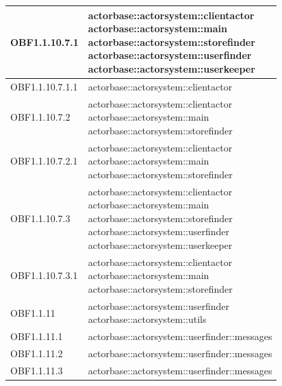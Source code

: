 \documentclass{scalatekids-article}
\begin{document}
\begin{longtable}[H]{|p{6cm}|p{11cm}|}
\hline
OBF1.1.10.7.1 & \multiLineCell[t]{actorbase::actorsystem::clientactor\\actorbase::actorsystem::main\\actorbase::actorsystem::storefinder\\actorbase::actorsystem::userfinder\\actorbase::actorsystem::userkeeper\\}\\
\hline
OBF1.1.10.7.1.1 & \multiLineCell[t]{actorbase::actorsystem::clientactor\\}\\
\hline
OBF1.1.10.7.2 & \multiLineCell[t]{actorbase::actorsystem::clientactor\\actorbase::actorsystem::main\\actorbase::actorsystem::storefinder\\}\\
\hline
OBF1.1.10.7.2.1 & \multiLineCell[t]{actorbase::actorsystem::clientactor\\actorbase::actorsystem::main\\actorbase::actorsystem::storefinder\\}\\
\hline
OBF1.1.10.7.3 & \multiLineCell[t]{actorbase::actorsystem::clientactor\\actorbase::actorsystem::main\\actorbase::actorsystem::storefinder\\actorbase::actorsystem::userfinder\\actorbase::actorsystem::userkeeper\\}\\
\hline
OBF1.1.10.7.3.1 & \multiLineCell[t]{actorbase::actorsystem::clientactor\\actorbase::actorsystem::main\\actorbase::actorsystem::storefinder\\}\\
\hline
OBF1.1.11 & \multiLineCell[t]{actorbase::actorsystem::userfinder\\actorbase::actorsystem::utils\\}\\
\hline
OBF1.1.11.1 & \multiLineCell[t]{actorbase::actorsystem::userfinder::messages\\}\\
\hline
OBF1.1.11.2 & \multiLineCell[t]{actorbase::actorsystem::userfinder::messages\\}\\
\hline
OBF1.1.11.3 & \multiLineCell[t]{actorbase::actorsystem::userfinder::messages\\}\\

\end{longtable}
\end{document}
